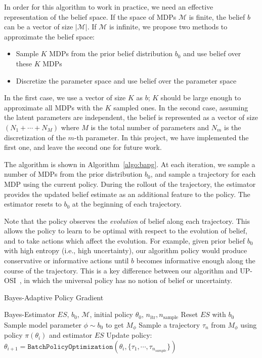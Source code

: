 \documentclass{article}
\newcommand{\aref}[1]{Algorithm~\ref{#1}}%
\DeclareMathOperator*{\argmin}{arg\,min}
\begin{document}
In order for this algorithm to work in practice, we need an effective representation of the belief space. If the space of MDPs $\mathcal{M}$ is finite, the belief $b$ can be a vector of size $|\mathcal{M}|$. If $\mathcal{M}$ is infinite, we propose two methods to approximate the belief space:

\begin{itemize}
    \item Sample $K$ MDPs from the prior belief distribution $b_0$ and use belief over these $K$ MDPs
    \item Discretize the parameter space and use belief over the parameter space
\end{itemize}
In the first case, we use a vector of size $K$ as $b$; $K$ should be large enough to approximate all MDPs with the $K$ sampled ones. In the second case, assuming the latent parameters are independent, the belief is represented as a vector of size $(N_1 + \cdots + N_M)$ where $M$ is the total number of parameters and $N_m$ is the discretization of the $m$-th parameter. In this project, we have implemented the first one, and leave the second one for future work.

The algorithm is shown in \aref{algo:bapg}. At each iteration, we sample a number of MDPs from the prior distribution $b_0$, and sample a trajectory for each MDP using the current policy. During the rollout of the trajectory, the estimator provides the updated belief estimate as an additional feature to the policy. The estimator resets to $b_0$ at the beginning of each trajectory.

Note that the policy observes the \emph{evolution} of belief along each trajectory. This allows the policy to learn to be optimal with respect to the evolution of belief, and to take actions which affect the evolution. For example, given prior belief $b_0$ with high entropy (i.e., high uncertainty), our algorithm policy would produce conservative or informative actions until $b$ becomes informative enough along the course of the trajectory. This is a key difference between our algorithm and UP-OSI~\cite{yu2017uposi}, in which the universal policy has no notion of belief or uncertainty.

%
%
\begin{algorithm}[tb]
\caption{Bayes-Adaptive Policy Gradient}
\label{algo:bapg}
\begin{algorithmic}[1]
\Require Bayes-Estimator $ES$, $b_0$, $\mathcal{M}$, initial policy $\theta_0$, $n_\text{itr}, n_\text{sample}$
\vspace{2mm}
    \State Reset $ES$ with $b_0$
    \State Sample model parameter $\phi \sim b_0$ to get $M_{\phi}$
    \State Sample a trajectory $\tau_n$ from $M_{\phi}$ using policy $\pi(\theta_i)$ and estimator $ES$
  \EndFor
  \State Update policy: $\theta_{i+1} = \texttt{BatchPolicyOptimization}(\theta_i, \{\tau_1, \cdots, \tau_{n_{sample}}\})$
\EndFor
\end{algorithmic}
\end{algorithm}
\end{document}
